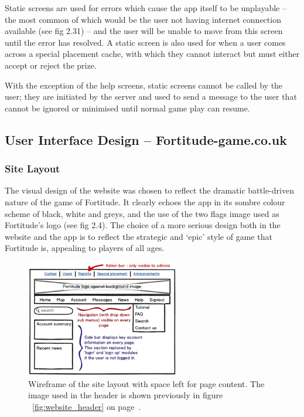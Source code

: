 Static screens are used for errors which cause the app itself to be unplayable – the most common of which would be the user not having internet connection available (see fig 2.31) – and the user will be unable to move from this screen until the error has resolved. A static screen is also used for when a user comes across a special placement cache, with which they cannot interact but must either accept or reject the prize.

With the exception of the help screens, static screens cannot be called by the user; they are initiated by the server and used to send a message to the user that cannot be ignored or minimised until normal game play can resume.

\subsection{User Interface Design – Fortitude-game.co.uk}

\subsubsection{Site Layout}

The visual design of the website was chosen to reflect the dramatic battle-driven nature of the game of Fortitude. It clearly echoes the app in its sombre colour scheme of black, white and greys, and the use of the two flags image used as Fortitude’s logo (see fig 2.4). The choice of a more serious design both in the website and the app is to reflect the strategic and ‘epic’ style of game that Fortitude is, appealing to players of all ages.

\begin{figure}
	\vspace{-30pt}
	\begin{center}
	\includegraphics[width=0.6\textwidth]{images/website_wireframe}
	\caption{Wireframe of the site layout with space left for page content. The image used in the header is shown previously in figure ~\ref{fig:website_header} on page~\pageref{fig:website_header}.}
	\label{website_wireframe}
	\end{center}
	\vspace{-20pt}
\end{figure}

